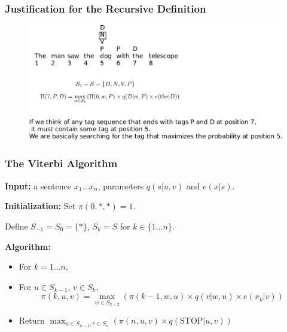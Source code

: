 \documentclass[handout]{beamer}
\begin{document}
\begin{frame}
  \frametitle{Justification for the Recursive Definition}

  \begin{figure}[h]
        	\includegraphics[scale = 0.65]{pics/viterbi2.pdf}
        \end{figure}
\end{frame}

\begin{frame}
  \frametitle{The Viterbi Algorithm}
  \textbf{Input:} a sentence $x_1 \ldots x_n$, parameters $q(s|u, v)$ and $e(x|s)$.

  \textbf{Initialization:} Set $\pi(0, *, *) = 1$.

  Define $S_{-1} = S_0 = \{*\}$, $S_k = S$ for $k \in \{1 \ldots n\}$.

  \textbf{Algorithm:}
  \begin{itemize}
    \item For $k = 1 \ldots n$,
    \item For $u \in S_{k-1}$, $v \in S_k$,
    \[
      \pi(k, u, v) = \max_{w \in S_{k-2}} (\pi(k - 1, w, u) \times q(v|w, u) \times e(x_k|v))
    \]
    \item Return $\max_{u \in S_{n-1}, v \in S_n} (\pi(n, u, v) \times q(\text{STOP}|u, v))$
  \end{itemize}
\end{frame}
\end{document}
